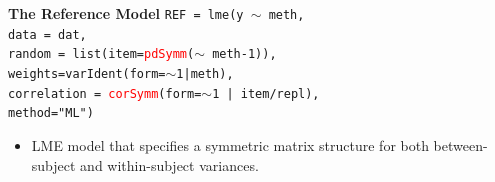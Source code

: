 \documentclass[compress]{beamer}        %
\makeatletter
\newcommand{\tcb}{\textcolor{beamer@blendedblue}}
\newcommand{\tcr}{\textcolor{red}}
\makeatother
\begin{document}
		\begin{frame}[fragile]{\bf \tcb{The Reference Model}}
			\texttt{REF = lme(y $\sim$ meth,\\
				\hspace{0.6cm} data = dat,\\
				\hspace{0.6cm} random = list(item=\tcr{pdSymm}($\sim$ meth-1)), \\
				\hspace{0.6cm} weights=varIdent(form=$\sim$1|meth),\\
				\hspace{0.6cm} correlation = \tcr{corSymm}(form=$\sim$1 | item/repl),\\
				\hspace{0.6cm} method="ML")}\\
			\begin{itemize}
				\item LME model that specifies a symmetric matrix structure for both between-subject and within-subject variances.
			\end{itemize}
			
		\end{frame}
		
\end{document}
